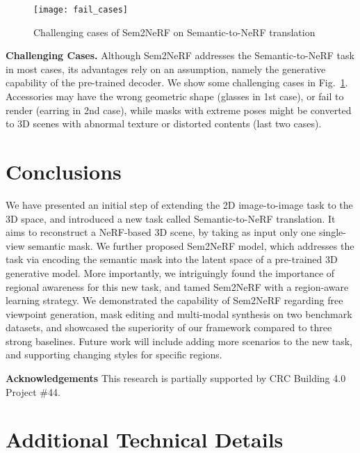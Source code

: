 \documentclass[runningheads]{llncs}
\begin{document}
\begin{figure}[t!]
    \centering
    \texttt{[image: fail\_cases]}
    \caption{Challenging cases of Sem2NeRF on Semantic-to-NeRF translation}
    \label{fig:fail_cases}
\end{figure}


\noindent\textbf{Challenging Cases.} Although Sem2NeRF addresses the Semantic-to-NeRF task in most cases, its advantages rely on an assumption, namely the generative capability of the pre-trained decoder. We show some challenging cases in Fig.~\ref{fig:fail_cases}. Accessories may have the wrong geometric shape (glasses in 1st case), or fail to render (earring in 2nd case), while masks with extreme poses might be converted to 3D scenes with abnormal texture or distorted contents (last two cases).  



\section{Conclusions}

We have presented an initial step of extending the 2D image-to-image task to the 3D space, and introduced a new task called Semantic-to-NeRF translation. It aims to reconstruct a NeRF-based 3D scene, by taking as input only one single-view semantic mask. We further proposed Sem2NeRF model, which addresses the task via encoding the semantic mask into the latent space of a pre-trained 3D generative model.
More importantly, we intriguingly found the importance of regional awareness for this new task, and  tamed Sem2NeRF with a region-aware learning strategy. We demonstrated the capability of Sem2NeRF regarding free viewpoint generation, mask editing and multi-modal synthesis on two benchmark datasets, and showcased the superiority of our framework compared to three strong baselines. Future work will include adding more scenarios to the new task, and supporting changing styles for specific regions.

\noindent \textbf{Acknowledgements} This research is partially supported by CRC Building 4.0 Project \#44.



\clearpage






\clearpage

\appendix
\section{Additional Technical Details} \label{sec:tech}
\end{document}
